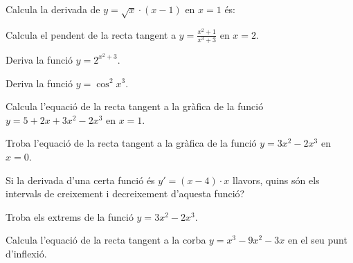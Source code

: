 \begin{autoaval}{26}

\begin{mylist}
	 
	
	\exer[2] Calcula la derivada de $y  = \sqrt{x} \cdot (x - 1)$ en $x = 1$ és:
	
	\exer[2] Calcula el pendent de la recta tangent a   $y=\frac{x^{2} +1}{x^{3} +3} $  en $x = 2$.
		 
	\exer[2] Deriva la funció $y=2^{x^2 + 3}$.
	
	\exer[2] Deriva la funció $y = \cos^2 x^3$.
	
	\exer[2] Calcula l'equació de la recta tangent a la gràfica de la funció $y = 5 + 2x + 3x^2 - 2x^3$ en $x = 1$.
	
	\exer[2] Troba l'equació de la recta tangent a la gràfica de la funció $y = 3x^2 - 2x^3$ en $x = 0$.
	
	\exer[2] Si la derivada d'una certa funció és $y' = (x - 4)\cdot x$ llavors, quins són els intervals de creixement i decreixement d'aquesta funció?
	
	\exer[2]  Troba els extrems de la funció $y = 3x^2 - 2x^3$.
	
	\exer[2] Calcula l'equació de la recta tangent a la corba $y=x^3-9x^2-3x$ en el seu punt d'inflexió.
	
	\end{mylist}
\end{autoaval}


